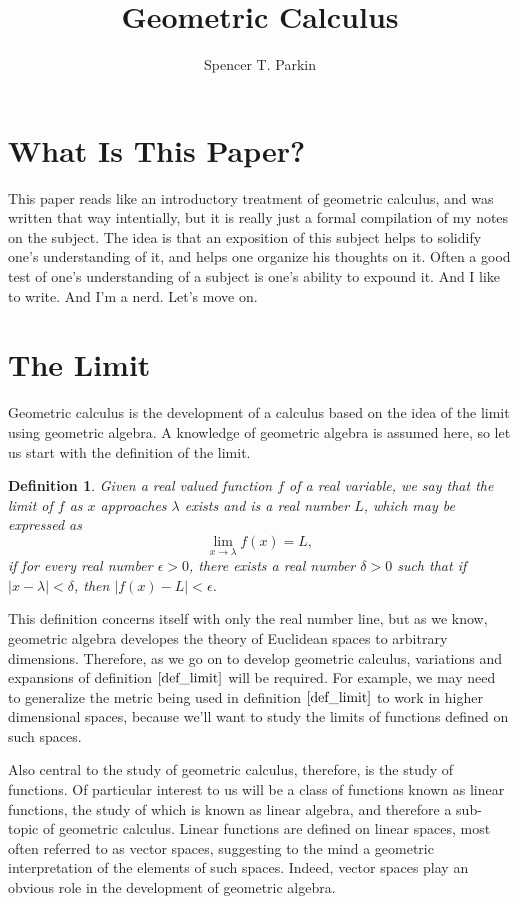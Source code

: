 \documentclass[12pt]{article}
\title{Geometric Calculus}
\author{Spencer T. Parkin}
\newtheorem{definition}{Definition}[section]
\begin{document}
\maketitle

\section{What Is This Paper?}

This paper reads like an introductory treatment of geometric calculus, and was
written that way intentially, but it is really just a formal compilation of my notes
on the subject.
The idea is that an exposition of this subject helps to solidify one's understanding
of it, and helps one organize his thoughts on it.  Often a good test of one's understanding
of a subject is one's ability to expound it.  And I like to write.  And I'm a nerd.
Let's move on.

\section{The Limit}

Geometric calculus is the development of a calculus based on the idea of the limit
using geometric algebra.  A knowledge of geometric algebra is assumed here, so
let us start with the definition of the limit.
\begin{definition}\label{def_limit}
Given a real valued function $f$ of a real variable, we say that the limit
of $f$ as $x$ approaches $\lambda$ exists and is a real number $L$, which
may be expressed as
\begin{equation*}
\lim_{x\to\lambda}f(x) = L,
\end{equation*}
if for every real number $\epsilon>0$, there exists a real number $\delta>0$
such that if $|x-\lambda|<\delta$, then $|f(x)-L|<\epsilon$.
\end{definition}
This definition concerns itself with only the real number line, but as we know, geometric
algebra developes the theory of Euclidean spaces to arbitrary dimensions.  Therefore,
as we go on to develop geometric calculus, variations and expansions of definition $\eqref{def_limit}$
will be required.  For example, we may need to generalize the metric being used in
definition $\eqref{def_limit}$ to work in higher dimensional spaces, because we'll
want to study the limits of functions defined on such spaces.

Also central to the study of geometric calculus, therefore, is the study of functions.
Of particular interest to us will be a class of functions known as linear functions,
the study of which is known as linear algebra, and therefore a sub-topic of geometric calculus.
Linear functions are defined on linear spaces, most often referred to as vector spaces,
suggesting to the mind a geometric interpretation of the elements of such spaces.
Indeed, vector spaces play an obvious role in the development of geometric algebra.
\end{document}
